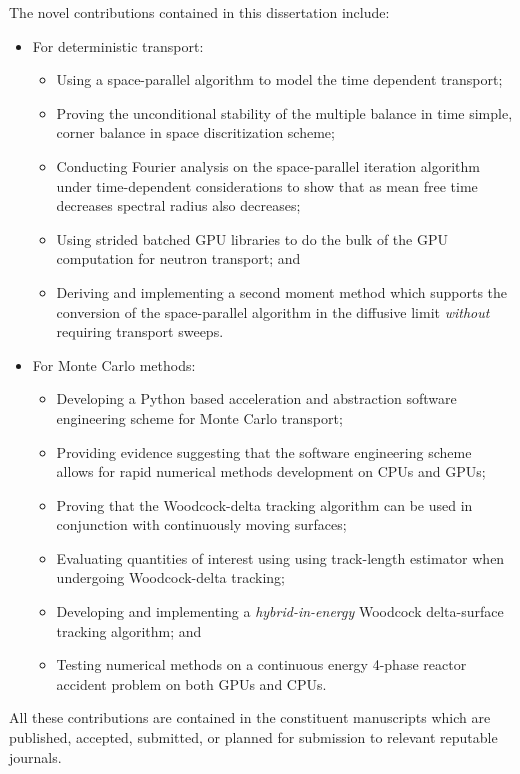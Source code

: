 The novel contributions contained in this dissertation include:
\begin{itemize}
    \item For deterministic \sn transport:
    \begin{itemize}
        \item Using a space-parallel algorithm to model the time dependent transport;
        \item Proving the unconditional stability of the multiple balance in time simple, corner balance in space discritization scheme;
        \item Conducting Fourier analysis on the space-parallel iteration algorithm under time-dependent considerations to show that as mean free time decreases spectral radius also decreases; 
        \item Using strided batched GPU libraries to do the bulk of the GPU computation for neutron transport; and
        \item Deriving and implementing a second moment method which supports the conversion of the space-parallel algorithm in the diffusive limit \emph{without} requiring transport sweeps.
    \end{itemize}
    \item For Monte Carlo methods:
    \begin{itemize}
        \item Developing a Python based acceleration and abstraction software engineering scheme for Monte Carlo transport;
        \item Providing evidence suggesting that the software engineering scheme allows for rapid numerical methods development on CPUs and GPUs;
        \item Proving that the Woodcock-delta tracking algorithm can be used in conjunction with continuously moving surfaces;
        \item Evaluating quantities of interest using using track-length estimator when undergoing Woodcock-delta tracking;
        \item Developing and implementing a \emph{hybrid-in-energy} Woodcock delta-surface tracking algorithm; and
        \item Testing numerical methods on a continuous energy 4-phase reactor accident problem on both GPUs and CPUs.
    \end{itemize}
\end{itemize}
All these contributions are contained in the constituent manuscripts which are published, accepted, submitted, or planned for submission to relevant reputable journals.

